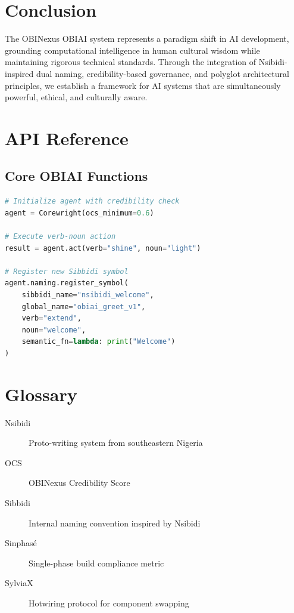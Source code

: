 \documentclass[12pt,a4paper]{article}
\begin{document}
\section{Conclusion}

The OBINexus OBIAI system represents a paradigm shift in AI development, grounding computational intelligence in human cultural wisdom while maintaining rigorous technical standards. Through the integration of Nsibidi-inspired dual naming, credibility-based governance, and polyglot architectural principles, we establish a framework for AI systems that are simultaneously powerful, ethical, and culturally aware.

\appendix
\section{API Reference}

\subsection{Core OBIAI Functions}
\begin{lstlisting}[language=Python]
# Initialize agent with credibility check
agent = Corewright(ocs_minimum=0.6)

# Execute verb-noun action
result = agent.act(verb="shine", noun="light")

# Register new Sibbidi symbol
agent.naming.register_symbol(
    sibbidi_name="nsibidi_welcome",
    global_name="obiai_greet_v1",
    verb="extend",
    noun="welcome",
    semantic_fn=lambda: print("Welcome")
)
\end{lstlisting}

\section{Glossary}

\begin{description}
\item[Nsibidi] Proto-writing system from southeastern Nigeria
\item[OCS] OBINexus Credibility Score
\item[Sibbidi] Internal naming convention inspired by Nsibidi
\item[Sinphasé] Single-phase build compliance metric
\item[SylviaX] Hotwiring protocol for component swapping
\end{description}
\end{document}

